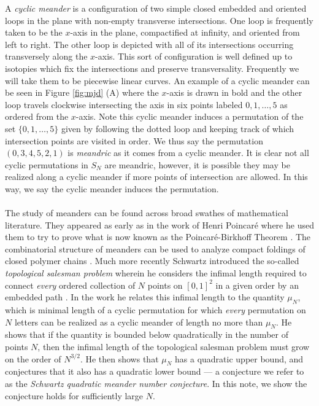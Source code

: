 \documentclass[11pt,a4paper]{amsart}
\theoremstyle{definition}
\theoremstyle{remark}
\begin{document}
A \emph{cyclic meander} is a configuration of two simple closed embedded and oriented loops in the plane with non-empty transverse intersections.  One loop is frequently taken to be the $x$-axis in the plane, compactified at infinity, and oriented from left to right.  The other loop is depicted with all of its intersections occurring transversely along the $x$-axis.  This sort of configuration is well defined up to isotopies which fix the intersections and preserve transversality.  Frequently we will take them to be piecewise linear curves.  An example of a cyclic meander can be seen in Figure \ref{fig:mjd} (A) where the $x$-axis is drawn in bold and the other loop travels clockwise intersecting the axis in six points labeled $0, 1, \hdots, 5$ as ordered from the $x$-axis. Note this cyclic meander induces a permutation of the set $\{0,1,\hdots, 5\}$ given by following the dotted loop and keeping track of which intersection points are visited in order.  We thus say the permutation $(0,3,4,5,2,1)$ is \emph{meandric} as it comes from a cyclic meander.  It is clear not all cyclic permutations in $S_{N}$ are meandric, however, it is possible they may be realized along a cyclic meander if more points of intersection are allowed.  In this way, we say the cyclic meander induces the permutation.  
\\
\\
The study of meanders can be found across broad swathes of mathematical literature.  They appeared as early as in the work of Henri Poincar\'{e} where he used them to try to prove what is now known as the Poincar\'{e}-Birkhoff Theorem \cite{Poincare1912Sur}.  The combinatorial structure of meanders can be used to analyze compact foldings of closed polymer chains \cite{DIFRANCESCO199797}.  Much more recently Schwartz introduced the so-called \emph{topological salesman problem} wherein he considers the infimal length required to connect \emph{every} ordered collection of $N$ points on $[0,1]^{2}$ in a given order by an embedded path \cite{richtpss}.  In the work he relates this infimal length to the quantity $\mu_{N}$, which is minimal length of a cyclic permutation for which \emph{every} permutation on $N$ letters can be realized as a cyclic meander of length no more than $\mu_{N}$.  He shows that if the quantity is bounded below quadratically in the number of points $N$, then the infimal length of the topological salesman problem must grow on the order of $N^{3/2}$. He then shows that $\mu_N$ has a quadratic upper bound, and conjectures that it also has a quadratic lower bound --- a conjecture we refer to as the \emph{Schwartz quadratic meander number conjecture}. In this note, we show the conjecture holds for sufficiently large $N$.\\
\end{document}
